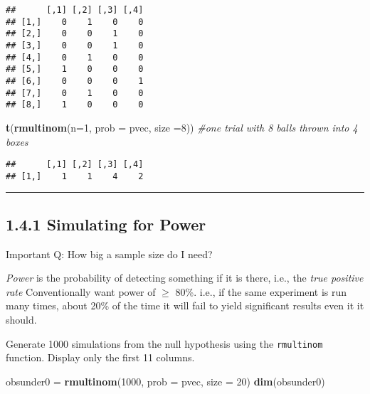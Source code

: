 \documentclass[]{article}
\newenvironment{Shaded}{\begin{snugshade}}{\end{snugshade}}
\newcommand{\KeywordTok}[1]{\textcolor[rgb]{0.13,0.29,0.53}{\textbf{#1}}}
\newcommand{\DataTypeTok}[1]{\textcolor[rgb]{0.13,0.29,0.53}{#1}}
\newcommand{\DecValTok}[1]{\textcolor[rgb]{0.00,0.00,0.81}{#1}}
\newcommand{\StringTok}[1]{\textcolor[rgb]{0.31,0.60,0.02}{#1}}
\newcommand{\CommentTok}[1]{\textcolor[rgb]{0.56,0.35,0.01}{\textit{#1}}}
\newcommand{\NormalTok}[1]{#1}
\let\oldrule=\rule
\renewcommand{\rule}[1]{\oldrule{\linewidth}}
\begin{document}
\begin{verbatim}
##      [,1] [,2] [,3] [,4]
## [1,]    0    1    0    0
## [2,]    0    0    1    0
## [3,]    0    0    1    0
## [4,]    0    1    0    0
## [5,]    1    0    0    0
## [6,]    0    0    0    1
## [7,]    0    1    0    0
## [8,]    1    0    0    0
\end{verbatim}

\begin{Shaded}
\begin{Highlighting}[]
\KeywordTok{t}\NormalTok{(}\KeywordTok{rmultinom}\NormalTok{(}\DataTypeTok{n=}\DecValTok{1}\NormalTok{, }\DataTypeTok{prob =}\NormalTok{ pvec, }\DataTypeTok{size =}\DecValTok{8}\NormalTok{)) }\CommentTok{#one trial with 8 balls thrown into 4 boxes}
\end{Highlighting}
\end{Shaded}

\begin{verbatim}
##      [,1] [,2] [,3] [,4]
## [1,]    1    1    4    2
\end{verbatim}

\begin{center}\rule{0.5\linewidth}{\linethickness}\end{center}

\subsection{1.4.1 Simulating for Power}\label{simulating-for-power}

Important Q: How big a sample size do I need?

\emph{Power} is the probability of detecting something if it is there,
i.e., the \emph{true positive rate} Conventionally want power of
\(\geq\) 80\%. i.e., if the same experiment is run many times, about
20\% of the time it will fail to yield significant results even it it
should.

Generate 1000 simulations from the null hypothesis using the
\texttt{rmultinom} function. Display only the first 11 columns.

\begin{Shaded}
\begin{Highlighting}[]
\NormalTok{obsunder0 =}\StringTok{ }\KeywordTok{rmultinom}\NormalTok{(}\DecValTok{1000}\NormalTok{, }\DataTypeTok{prob =}\NormalTok{ pvec, }\DataTypeTok{size =} \DecValTok{20}\NormalTok{)}
\KeywordTok{dim}\NormalTok{(obsunder0)}
\end{Highlighting}
\end{Shaded}
\end{document}
